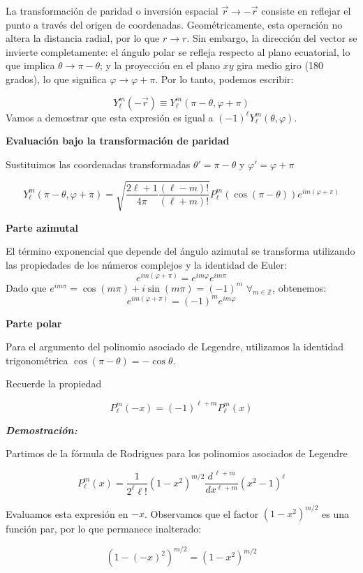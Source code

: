 \documentclass[a4paper]{article}
\begin{document}
\begin{enumerate}[a)]
La transformación de paridad o inversión espacial $\vec{r} \to -\vec{r}$ consiste en reflejar el punto a través del origen de coordenadas. Geométricamente, esta operación no altera la distancia radial, por lo que $r \to r$. Sin embargo, la dirección del vector se invierte completamente: el ángulo polar se refleja respecto al plano ecuatorial, lo que implica $\theta \to \pi - \theta$; y la proyección en el plano $xy$ gira medio giro (180 grados), lo que significa $\varphi \to \varphi + \pi$. Por lo tanto, podemos escribir:

$$
Y_\ell^m(-\vec{r}) \equiv Y_\ell^m(\pi-\theta, \varphi+\pi)
$$
Vamos a demostrar que esta expresión es igual a $(-1)^\ell Y_\ell^m(\theta,\varphi)$.

\textbf{Evaluación bajo la transformación de paridad}

Sustituimos las coordenadas transformadas $\theta' = \pi - \theta$ y $\varphi' = \varphi + \pi$ 

$$
Y_\ell^m(\pi - \theta, \varphi + \pi) = \sqrt{\frac{2\ell+1}{4\pi} \frac{(\ell-m)!}{(\ell+m)!}} P_\ell^m(\cos(\pi - \theta)) e^{im(\varphi + \pi)}
$$

\textbf{Parte azimutal}

El término exponencial que depende del ángulo azimutal se transforma utilizando las propiedades de los números complejos y la identidad de Euler:
$$
e^{im(\varphi + \pi)} = e^{im\varphi} e^{im\pi}
$$
Dado que $e^{im\pi} = \cos(m\pi) + i\sin(m\pi) = (-1)^m$  $	\forall_{m\in\mathbb{Z}}$, obtenemos:
$$
e^{im(\varphi + \pi)} = (-1)^m e^{im\varphi}
$$

\textbf{Parte polar} 

Para el argumento del polinomio asociado de Legendre, utilizamos la identidad trigonométrica $\cos(\pi - \theta) = -\cos\theta$. 

Recuerde la propiedad

$$
P_\ell^m(-x) = (-1)^{\ell+m} P_\ell^m(x)
$$

\textbf{\textit{Demostración:}}

Partimos de la fórmula de Rodrigues para los polinomios asociados de Legendre

$$
P_\ell^m(x) = \frac{1}{2^\ell \ell!} (1-x^2)^{m/2} \frac{d^{\,\ell+m}}{dx^{\ell+m}} (x^2 - 1)^\ell
$$

Evaluamos esta expresión en $-x$. Observamos que el factor $(1-x^2)^{m/2}$ es una función par, por lo que permanece inalterado:

$$
(1-(-x)^2)^{m/2} = (1-x^2)^{m/2}
$$


\end{enumerate}
\end{document}
